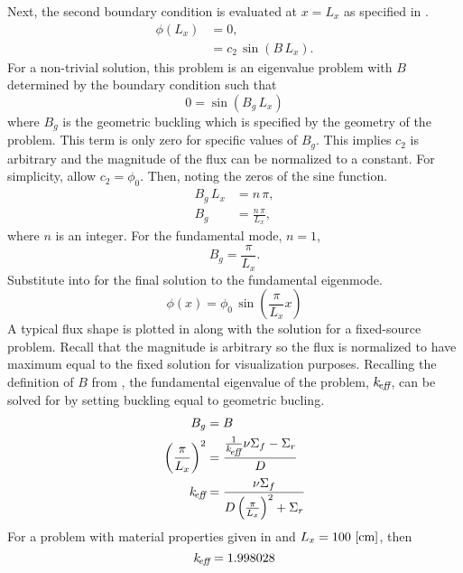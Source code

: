   Next, the second boundary condition is evaluated at $x=L_x$ as specified in
  .
  \begin{align}
    \phi(L_x) &= 0 ,\\
    &= c_2 \, \sin(B \, L_x).
  \end{align}
  For a non-trivial solution, this problem is an eigenvalue problem with $B$
  determined by the boundary condition such that 
  \begin{equation}
    0 = \sin(B_g \, L_x)
  \end{equation}
  where $B_g$ is the geometric buckling which is specified by the geometry of
  the problem. This term is only zero for specific values of $B_g$.
  This implies $c_2$ is arbitrary and the
  magnitude of the flux can be normalized to a constant. For simplicity, allow
  $c_2 = \phi_0$. Then, noting the zeros of the sine function.
  \begin{align}
    B_g \, L_x &= n \, \pi, \\
    B_g &= \frac{n \, \pi}{L_x},
  \end{align}
  where $n$ is an integer. For the fundamental mode, $n=1$,
  \begin{equation}
    \label{eq:1d1g_buckle_geom}
    B_g = \frac{\pi}{L_x}.
  \end{equation}
  Substitute  into  for the final
  solution to the fundamental eigenmode.
  \begin{equation}
    \label{eq:analytic_1d1g}
    \phi(x) = \phi_0 \, \sin\left(\frac{\pi}{L_x} x \right)
  \end{equation}
  A typical flux shape is plotted in  along with the
  solution for a fixed-source problem. Recall that the magnitude is arbitrary so 
  the flux is normalized to have maximum equal to the fixed solution for 
  visualization purposes.
  Recalling the definition of $B$ from , the fundamental
  eigenvalue of the problem, $k_{\!\mbox{\scriptsize \em eff}}$, can be solved for by setting buckling
  equal to geometric bucling.
  \begin{align}
    B_g &= B \\
    \left( \frac{\pi}{L_x} \right)^2 &= 
      \frac{\frac{1}{k_{\!\mbox{\scriptsize \em eff}}} \nu \Sigma_f - \Sigma_r}{D} \\
    \label{eq:keff1d}
    k_{\!\mbox{\scriptsize \em eff}} &= \frac{\nu \Sigma_f}{D \left(\frac{\pi}{L_x}\right)^2 + \Sigma_r}
  \end{align}
  For a problem with material properties given in  and 
  $L_x = 100 \,\left[\text{{cm}}\right]$, then
  \begin{equation}
    k_{\!\mbox{\scriptsize \em eff}} = 1.998028
  \end{equation}

